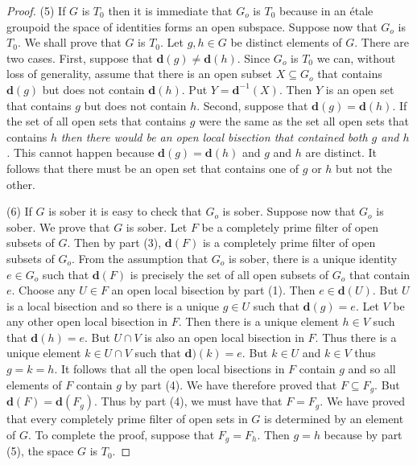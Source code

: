 \documentclass[a4paper]{amsart}
\begin{document}
\begin{proof}
(5) If $G$ is $T_{0}$ then it is immediate that $G_{o}$ is $T_{0}$ because in an \'etale groupoid
the space of identities forms an open subspace.
Suppose now that $G_{o}$ is $T_{0}$.
We shall prove that $G$ is $T_{0}$.
Let $g,h \in G$ be distinct elements of $G$.
There are two cases.
First, suppose that $\mathbf{d}(g) \neq \mathbf{d}(h)$.
Since $G_{o}$ is $T_{0}$ we can, without loss of generality, assume that there is an open subset $X \subseteq G_{o}$
that contains $\mathbf{d}(g)$ but does not contain $\mathbf{d}(h)$.
Put $Y = \mathbf{d}^{-1}(X)$.
Then $Y$ is an open set that contains $g$ but does not contain $h$.
Second, suppose that $\mathbf{d}(g)  = \mathbf{d}(h)$.
If the set of all open sets that contains $g$ were the same as the set all open sets that contains $h$
{\em then there would be an open local bisection that contained both $g$ and $h$.}
This cannot happen because $\mathbf{d}(g) = \mathbf{d}(h)$ and $g$ and $h$ are distinct.
It follows that there must be an open set that contains one of $g$ or $h$ but not the other. 

(6) If $G$ is sober it is easy to check that $G_{o}$ is sober.
Suppose now that $G_{o}$ is sober. 
We prove that $G$ is sober.
Let $F$ be a completely prime filter of open subsets of $G$.
Then by part (3), $\mathbf{d}(F)$ is a completely prime filter of open subsets of $G_{o}$.
From the assumption that $G_{o}$ is sober, there is a unique identity $e \in G_{o}$
such that $\mathbf{d}(F)$ is precisely the set of all open subsets of $G_{o}$ that contain $e$.
Choose any $U \in F$ an open local bisection by part (1).
Then $e \in \mathbf{d}(U)$.
But $U$ is a local bisection and so there is a unique $g \in U$ such that $\mathbf{d}(g) = e$.
Let $V$ be any other open local bisection in $F$.
Then there is a unique element $h \in V$ such that $\mathbf{d}(h) = e$.
But $U \cap V$ is also an open local bisection in $F$.
Thus there is a unique element $k \in U \cap V$ such that $\mathbf{d})(k) = e$.
But $k \in U$ and $k \in V$ thus $g = k = h$.
It follows that all the open local bisections in $F$ contain $g$ and so all elements of $F$ contain $g$ by part (4).
We have therefore proved that $F \subseteq F_{g}$.
But $\mathbf{d}(F) = \mathbf{d}(F_{g})$.
Thus by part (4), we must have that $F = F_{g}$.
We have proved that every completely prime filter of open sets in $G$ is determined by an element of $G$.
To complete the proof, suppose that $F_{g} = F_{h}$.
Then $g = h$ because by part (5), the space $G$ is $T_{0}$.
\end{proof}
\end{document}
